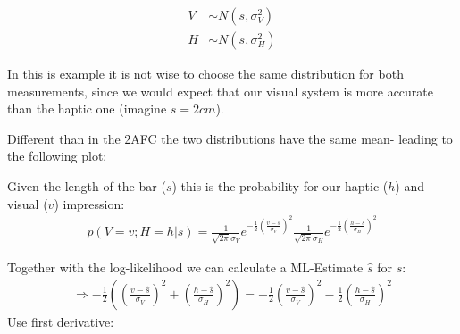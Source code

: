\documentclass[../main/Notes.tex]{subfiles}
\begin{document}
\begin{align*}
V &\sim N\left(s,\sigma_{V}^{2}\right)\\
H &\sim N\left(s,\sigma_{H}^{2}\right)
\end{align*}

In this is example it is not wise to choose the same distribution for both measurements, since we would expect that our visual system is more accurate than the haptic one (imagine $s=2cm$).
\begin{figure}[ht!]
\centering
{} 
\end{figure}
\newpage

Different than in the 2AFC the two distributions have the same mean- leading to the following plot: 
\begin{figure}[ht!]
\centering
{}
\end{figure}

Given the length of the bar ($s$) this is the probability for our haptic ($h$) and visual ($v$) impression:
\smallskip
\begin{align*}
p\left(V=v;H=h|s\right)=\frac{1}{\sqrt{2\pi}\sigma_{V}}e^{-\frac{1}{2}\left(\frac{v-s}{\sigma_{V}}\right)^{2}}\frac{1}{\sqrt{2\pi}\sigma_{H}}e^{-\frac{1}{2}\left(\frac{h-s}{\sigma_{H}}\right)^{2}}
\end{align*}

Together with the log-likelihood we can calculate a ML-Estimate $\hat{s}$ for $s$:
\begin{align*}
\Rightarrow -\frac{1}{2}\left(\left(\frac{v-\hat{s}}{\sigma_{V}}\right)^{2} + \left(\frac{h-\hat{s}}{\sigma_{H}}\right)^{2}\right) = -\frac{1}{2}\left(\frac{v-\hat{s}}{\sigma_{V}}\right)^{2} -\frac{1}{2} \left(\frac{h-\hat{s}}{\sigma_{H}}\right)^{2}
\end{align*}
Use first derivative:
\end{document}
